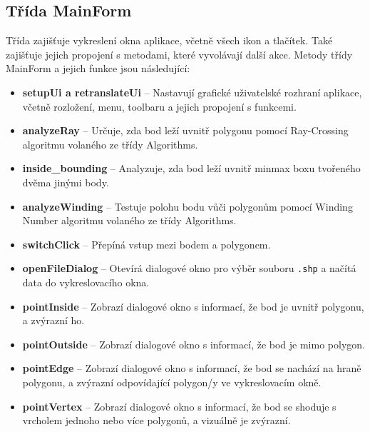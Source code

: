 \documentclass[a4paper,12pt]{article}
\begin{document}
\subsection{Třída MainForm}
Třída zajišťuje vykreslení okna aplikace, včetně všech ikon a tlačítek. Také zajišťuje jejich propojení s metodami, které vyvolávají další akce.
Metody třídy MainForm a jejich funkce jsou následující:
\begin{itemize}
    \item \textbf{setupUi a retranslateUi} – Nastavují grafické uživatelské rozhraní aplikace, včetně rozložení, menu, toolbaru a jejich propojení s funkcemi. 
    \item \textbf{analyzeRay} – Určuje, zda bod leží uvnitř polygonu pomocí Ray-Crossing algoritmu volaného ze třídy Algorithms.
    \item \textbf{inside_bounding} – Analyzuje, zda bod leží uvnitř minmax boxu tvořeného dvěma jinými body.
    \item \textbf{analyzeWinding} – Testuje polohu bodu vůči polygonům pomocí Winding Number algoritmu volaného ze třídy Algorithms.
    \item \textbf{switchClick} – Přepíná vstup mezi bodem a polygonem.
    \item \textbf{openFileDialog} – Otevírá dialogové okno pro výběr souboru \texttt{.shp} a načítá data do vykreslovacího okna.
    \item \textbf{pointInside} – Zobrazí dialogové okno s informací, že bod je uvnitř polygonu, a zvýrazní ho.
    \item \textbf{pointOutside} – Zobrazí dialogové okno s informací, že bod je mimo polygon.
    \item \textbf{pointEdge} – Zobrazí dialogové okno s informací, že bod se nachází na hraně polygonu, a zvýrazní odpovídající polygon/y ve vykreslovacím okně.
    \item \textbf{pointVertex} – Zobrazí dialogové okno s informací, že bod se shoduje s vrcholem jednoho nebo více polygonů, a vizuálně je zvýrazní.
\end{itemize}
\end{document}
